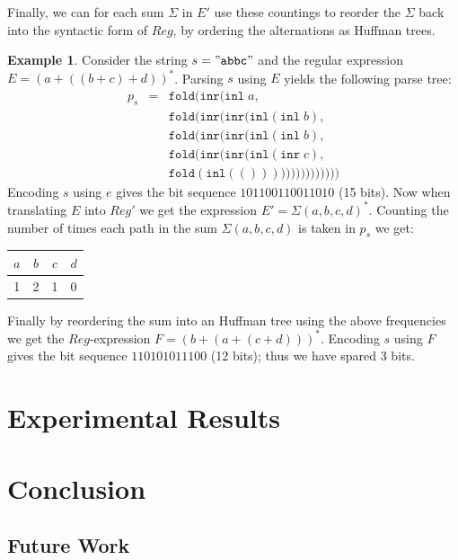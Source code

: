 \documentclass[a4paper, oneside]{memoir}
\theoremstyle{definition}
\newtheorem{example}{Example}
\begin{document}
Finally, we can for each sum $\Sigma$ in $E'$ use these countings to reorder the $\Sigma$ back into the syntactic form of $Reg$, by ordering the alternations as Huffman trees.

\begin{example}
Consider the string $s = \mathtt{"abbc"}$ and the regular expression $E = (a + ((b + c) + d))^{*}$. Parsing $s$ using $E$ yields the following parse tree:
\[
\begin{array}{rcl}
p_s & = & \mathtt{fold}(\mathtt{inr}(\mathtt{inl} \; a, \\
    &   & \mathtt{fold}(\mathtt{inr}(\mathtt{inr}(\mathtt{inl}(\mathtt{inl} \; b), \\
    &   & \mathtt{fold}(\mathtt{inr}(\mathtt{inr}(\mathtt{inl}(\mathtt{inl} \; b), \\
    &   & \mathtt{fold}(\mathtt{inr}(\mathtt{inr}(\mathtt{inl}(\mathtt{inr} \; c), \\
    &   & \mathtt{fold}(\mathtt{inl}(()))))))))))))))
\end{array}
\]
\noindent Encoding $s$ using $e$ gives the bit sequence $101100110011010$ (15 bits). Now when translating $E$ into $Reg'$ we get the expression $E' = \Sigma{(a, b, c, d)}^{*}$. Counting the number of times each path in the sum $\Sigma{(a, b, c, d)}$ is taken in $p_s$ we get:

\begin{center}
\begin{tabular}{c|c|c|c}
$a$ & $b$ & $c$ & $d$ \\
\hline
1   & 2   & 1   & 0
\end{tabular}
\end{center}

\noindent Finally by reordering the sum into an Huffman tree using the above frequencies we get the $Reg$-expression $F = (b + (a + (c + d)))^{*}$. Encoding $s$ using $F$ gives the bit sequence $110101011100$ (12 bits); thus we have spared 3 bits.

\end{example}

\section{Experimental Results}
\label{sec:experimental_results}

\section{Conclusion}
\label{sec:conclusion}

\subsection{Future Work}



\end{document}
